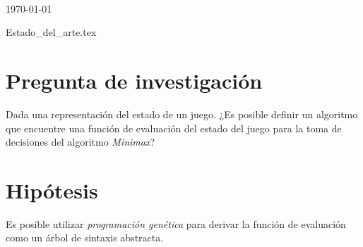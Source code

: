 \documentclass{article}
\begin{document}
  \begin{titlepage}
    \centering
    \vspace*{2cm}
    \titleblock [2cm]
    \vspace{1cm}
    \authorblock
    \vfill
    \location\\
    \today
  \end{titlepage}
  



  {Estado_del_arte.tex}










  \section{Pregunta de investigación}
    Dada una representación del estado de un juego. 
    ¿Es posible definir un algoritmo que encuentre una función de evaluación del estado del juego 
    para la toma de decisiones del algoritmo \textit{Minimax}?

  \section{Hipótesis}
    Es posible utilizar \textit{programación genética} para derivar la función de evaluación como
    un árbol de sintaxis abstracta.
\end{document}
